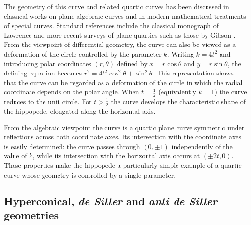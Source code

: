 \documentclass[11pt]{article}
\begin{document}
The geometry of this curve and related quartic curves has been discussed in classical works on plane algebraic curves and in modern mathematical treatments of special curves. Standard references include the classical monograph of Lawrence \cite{lawrence1972catalogue} and more recent surveys of plane quartics such as those by Gibson \cite{gibson2001elementary}. From the viewpoint of differential geometry, the curve can also be viewed as a deformation of the circle controlled by the parameter $k$. Writing $k=4t^2$ and introducing polar coordinates $(r,\theta)$ defined by $x=r\cos\theta$ and $y=r\sin\theta$, the defining equation becomes $r^2 = 4t^2\cos^2\theta + \sin^2\theta$. This representation shows that the curve can be regarded as a deformation of the circle in which the radial coordinate depends on the polar angle. When $t=\tfrac12$ (equivalently $k=1$) the curve reduces to the unit circle. For $t >\tfrac12$ the curve develops the characteristic shape of the hippopede, elongated along the horizontal axis.

From the algebraic viewpoint the curve is a quartic plane curve symmetric under reflections across both coordinate axes. Its intersection with the coordinate axes is easily determined: the curve passes through $(0,\pm1)$ independently of the value of $k$, while its intersection with the horizontal axis occurs at $(\pm 2t,0)$. These properties make the hippopede a particularly simple example of a quartic curve whose geometry is controlled by a single parameter.

\subsection{Hyperconical, \textit{de Sitter} and \textit{anti de Sitter} geometries}
\end{document}
